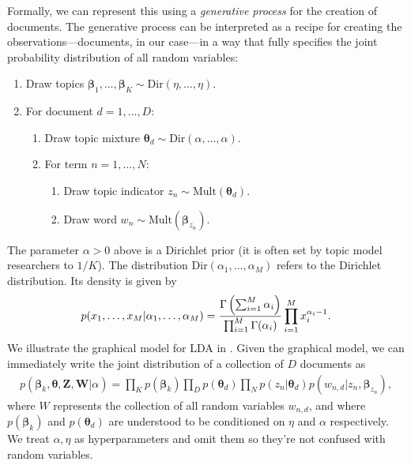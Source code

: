Formally, we can represent this using a \emph{generative process} for
the creation of documents.  The generative process can be interpreted as
a recipe for creating the observations---documents, in our case---in a
way that fully specifies the joint probability distribution of all
random variables:
\begin{enumerate}
  \item Draw topics $\bm \beta_1, \ldots, \bm \beta_K \sim
    \mbox{Dir}(\eta, \ldots, \eta)$.
    \item For document $d=1, \ldots, D$:
    \begin{enumerate}
    \item Draw topic mixture $\bm \theta_d \sim \mbox{Dir}(\alpha, \ldots, \alpha)$.
    \item For term $n=1, \ldots, N$:
      \begin{enumerate}
      \item Draw topic indicator $z_n \sim \mbox{Mult}(\bm \theta_d)$.
      \item Draw word $w_n \sim \mbox{Mult}(\bm \beta_{z_n})$.
      \end{enumerate}
    \end{enumerate}
\end{enumerate}
The parameter $\alpha > 0$ above is a Dirichlet prior (it is often set by
topic model researchers to $1/K$).  The distribution $\mbox{Dir}(\alpha_1, \ldots, \alpha_M)$ refers to the Dirichlet distribution.  Its density is given by
\begin{align}
  p(x_1, \ldots, x_M | \alpha_1, \ldots, \alpha_M) =
  \frac{\large \Gamma \left( \sum_{i=1}^M \alpha_i \right)}
       {\prod_{i=1}^M \large \Gamma(\alpha_i)}
       \prod_{i=1}^M x_i^{\alpha_i - 1}.
\end{align}
We illustrate the graphical model for LDA in .  Given the graphical model, we can immediately write the joint distribution of a collection of $D$ documents as
\begin{align}
  p(\bm \beta_k, \bm \theta, \bm Z, \bm W | \alpha) = 
  \prod_K p(\bm \beta_k)
  \prod_D p(\bm \theta_d) \prod_N p(z_n | \bm \theta_d) p(w_{n,d} | z_n, \bm \beta_{z_n}),
\end{align}
where $W$ represents the collection of all random variables $w_{n,d}$,
and where $p(\bm \beta_k)$ and $p(\bm \theta_d)$ are understood to be conditioned
on $\eta$ and $\alpha$ respectively.  We treat $\alpha, \eta$ as
hyperparameters and omit them so they're not confused with random
variables.

